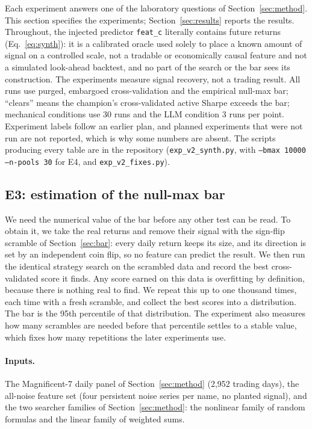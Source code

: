 \documentclass[11pt]{article}
\newcommand{\code}[1]{\texttt{#1}}
\begin{document}
Each experiment answers one of the laboratory questions of Section~\ref{sec:method}. This section
specifies the experiments; Section~\ref{sec:results} reports the results. Throughout, the injected
predictor \code{feat\_c} literally contains future returns (Eq.~\eqref{eq:synth}): it is a calibrated
oracle used solely to place a known amount of signal on a controlled scale, not a tradable or
economically causal feature and not a simulated look-ahead backtest, and no part of the search or the
bar sees its construction. The experiments measure signal recovery, not a trading result. All runs use
purged, embargoed cross-validation and the empirical null-max bar; ``clears'' means the champion's
cross-validated active Sharpe exceeds the bar; mechanical conditions use 30 runs and the LLM condition
3 runs per point. Experiment labels follow an earlier plan, and planned experiments that were not run are
not reported, which is why some numbers are absent. The scripts producing every table are in the repository (\code{exp\_v2\_synth.py},
with \code{--bmax 10000 --n-pools 30} for E4, and \code{exp\_v2\_fixes.py}).

\subsection{E3: estimation of the null-max bar}

We need the numerical value of the bar before any
other test can be read. To obtain it, we take the real returns and remove their signal with the sign-flip
scramble of Section~\ref{sec:bar}: every daily return keeps its size, and its direction is set by an
independent coin flip, so no feature can predict the result. We then run the identical strategy search on
the scrambled data and record the best cross-validated score it finds. Any score earned on this data is
overfitting by definition, because there is nothing real to find. We repeat this up to one thousand
times, each time with a fresh scramble, and collect the best scores into a distribution. The bar is the
95th percentile of that distribution. The experiment also measures how many scrambles are needed before
that percentile settles to a stable value, which fixes how many repetitions the later experiments use.

\paragraph{Inputs.} The Magnificent-7 daily panel of Section~\ref{sec:method} (2{,}952 trading days),
the all-noise feature set (four persistent noise series per name, no planted signal), and the two
searcher families of Section~\ref{sec:method}: the nonlinear family of random formulas and the linear
family of weighted sums.
\end{document}
